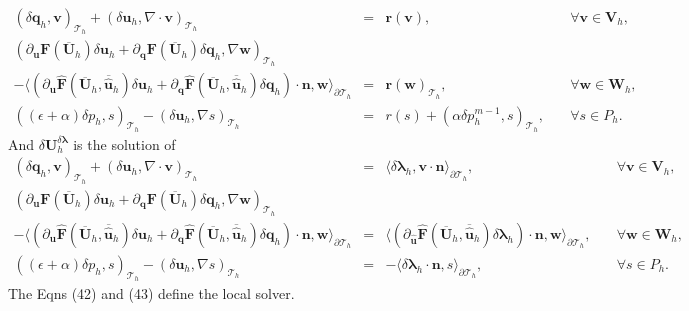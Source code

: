 \documentclass[11pt]{article}
\begin{document}
\begin{equation}
\begin{array}{rcll}
(\delta \bm{q}_h, \bm{v})_{\mathcal{T}_h} + (\delta \bm{u}_h, \nabla \cdot \bm{v})_{\mathcal{T}_h}   & = & \bm{r}(\bm{v}), & \quad \forall \bm{v} \in \bm{V}_h, \\[2ex] 
(\partial_{\bm{u}} \bm{F} (\overline{\bm{U}}_h) \delta \bm{u}_h + \partial_{\bm{q}} \bm{F} (\overline{\bm{U}}_h) \delta \bm{q}_h, \nabla \bm{w})_{\mathcal{T}_h} & & \\[2ex]
- \langle (\partial_{\bm{u}} \widehat{\bm{F}} (\overline{\bm{U}}_h,\overline{\widehat{\bm{u}}}_h) \delta \bm{u}_h + \partial_{{\bm{q}}} \widehat{\bm{F}} (\overline{\bm{U}}_h,\overline{\widehat{\bm{u}}}_h) \delta {\bm{q}}_h) \cdot \bm{n}, \bm{w} \rangle_{\partial \mathcal{T}_h}  & = &  \bm{r}(\bm{w})_{\mathcal{T}_h},  & \quad \forall \bm{w} \in \bm{W}_h, \\[2ex]
 ((\epsilon + \alpha) \delta p_h, s)_{\mathcal{T}_h} - (\delta \bm{u}_h, \nabla s)_{\mathcal{T}_h}   & = & r(s) +  (\alpha \delta p_h^{m-1}, s)_{\mathcal{T}_h}, & \quad \forall s \in P_h .
\end{array}
\end{equation}
And $\delta \bm{U}_h^{\delta \bm{\lambda}}$ is the solution of
\begin{equation}
\begin{array}{rcll}
(\delta \bm{q}_h, \bm{v})_{\mathcal{T}_h} + (\delta \bm{u}_h, \nabla \cdot \bm{v})_{\mathcal{T}_h}   & = & \langle \delta {\bm{\lambda}}_h, \bm{v} \cdot \bm{n} \rangle_{\partial \mathcal{T}_h}, & \quad \forall \bm{v} \in \bm{V}_h, \\[2ex] 
(\partial_{\bm{u}} \bm{F} (\overline{\bm{U}}_h) \delta \bm{u}_h + \partial_{\bm{q}} \bm{F} (\overline{\bm{U}}_h) \delta \bm{q}_h, \nabla \bm{w})_{\mathcal{T}_h} & & \\[2ex]
- \langle (\partial_{\bm{u}} \widehat{\bm{F}} (\overline{\bm{U}}_h,\overline{\widehat{\bm{u}}}_h) \delta \bm{u}_h + \partial_{{\bm{q}}} \widehat{\bm{F}} (\overline{\bm{U}}_h,\overline{\widehat{\bm{u}}}_h) \delta {\bm{q}}_h) \cdot \bm{n}, \bm{w} \rangle_{\partial \mathcal{T}_h}  & = &  \langle (\partial_{\widehat{\bm{u}}} \widehat{\bm{F}} (\overline{\bm{U}}_h,  \overline{\widehat{\bm{u}}}_h) \delta {\bm{\lambda}}_h) \cdot \bm{n}, \bm{w} \rangle_{\partial \mathcal{T}_h} ,  & \quad \forall \bm{w} \in \bm{W}_h, \\[2ex]
 ((\epsilon + \alpha) \delta p_h, s)_{\mathcal{T}_h} - (\delta \bm{u}_h, \nabla s)_{\mathcal{T}_h}   & = &  -\langle \delta {\bm{\lambda}}_h \cdot \bm{n},s \rangle_{\partial \mathcal{T}_h} , & \quad \forall s \in P_h .
\end{array}
\end{equation}
The Eqns (42) and (43) define the local solver.
\end{document}
